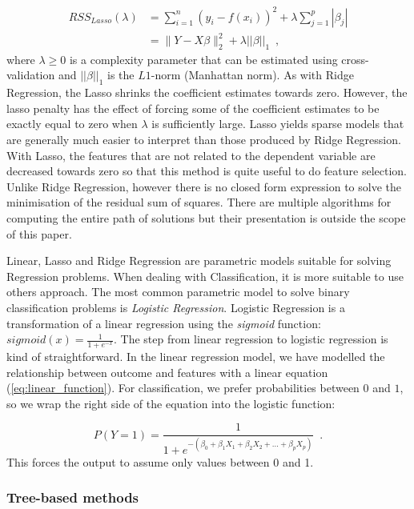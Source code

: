 \begin{equation}
\begin{aligned}
 RSS_{Lasso}(\lambda) & = \sum_{i=1}^{n}(y_i -f(x_i))^2 + \lambda\sum_{j=1}^{p}|\beta_{j}| \\
& = \|Y - X\beta\|_2^2 + \lambda||\beta||_1
    \enspace,
\end{aligned}
\end{equation}
where $\lambda \geq 0 $ is a complexity parameter that can be estimated using cross-validation and $||\beta||_1$ is the $L1$-norm (Manhattan norm). As with Ridge Regression, the Lasso shrinks the coefficient estimates towards zero. However, the lasso penalty has the effect of forcing some of the coefficient estimates to be exactly equal to zero when $\lambda$ is sufficiently large. Lasso yields sparse models that are generally much easier to interpret than those produced by Ridge Regression. With Lasso, the features that are not related to the dependent variable are decreased towards zero so that this method is quite useful to do feature selection. Unlike Ridge Regression, however there is no closed form expression to solve the minimisation of the residual sum of squares. There are multiple algorithms for computing the entire path of solutions but their presentation is outside the scope of this paper. 

Linear, Lasso and Ridge Regression are parametric models suitable for solving Regression problems. When dealing with Classification, it is more suitable to use others approach. The most common parametric model to solve binary classification problems is \textit{Logistic Regression}. Logistic Regression is a transformation of a linear regression using the \textit{sigmoid} function: $sigmoid(x) = \frac{1}{1 + e^{-x}}$. The step from linear regression to logistic regression is kind of straightforward. In the linear regression model, we have modelled the relationship between outcome and features with a linear equation (\ref{eq:linear_function}). For classification, we prefer probabilities between $0$ and $1$, so we wrap the right side of the equation into the logistic function:

\begin{equation}
    P(Y=1) = \frac{1}{1 + e^{- (\beta_0 + \beta_1X_1 + \beta_2X_2 + \ldots + \beta_pX_p)} }
    \enspace.
\end{equation}
This forces the output to assume only values between 0 and 1.

\subsubsection{Tree-based methods} \label{Tree-based methods}

